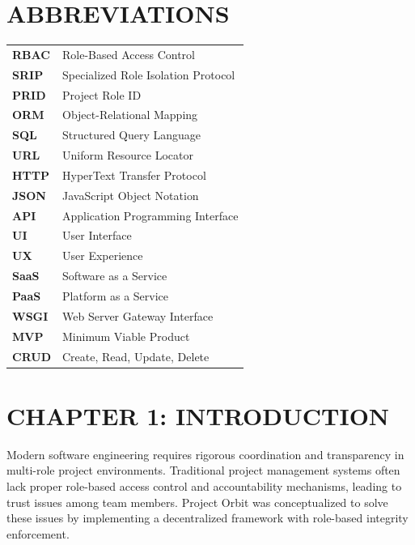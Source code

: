 ﻿\documentclass[12pt]{article}
\def\normaltext{\fontsize{12pt}{18pt}\color{secondary}}
\begin{document}
\section*{{\color{primary}ABBREVIATIONS}}
\normaltext
\begin{tabular}{p{4cm}p{10cm}}
\textbf{RBAC} & Role-Based Access Control \\
\textbf{SRIP} & Specialized Role Isolation Protocol \\
\textbf{PRID} & Project Role ID \\
\textbf{ORM} & Object-Relational Mapping \\
\textbf{SQL} & Structured Query Language \\
\textbf{URL} & Uniform Resource Locator \\
\textbf{HTTP} & HyperText Transfer Protocol \\
\textbf{JSON} & JavaScript Object Notation \\
\textbf{API} & Application Programming Interface \\
\textbf{UI} & User Interface \\
\textbf{UX} & User Experience \\
\textbf{SaaS} & Software as a Service \\
\textbf{PaaS} & Platform as a Service \\
\textbf{WSGI} & Web Server Gateway Interface \\
\textbf{MVP} & Minimum Viable Product \\
\textbf{CRUD} & Create, Read, Update, Delete \\
\end{tabular}
\newpage

\section*{{\color{primary}CHAPTER 1: INTRODUCTION}}
\normaltext
Modern software engineering requires rigorous coordination and transparency in multi-role project environments. Traditional project management systems often lack proper role-based access control and accountability mechanisms, leading to trust issues among team members. Project Orbit was conceptualized to solve these issues by implementing a decentralized framework with role-based integrity enforcement.
\end{document}
